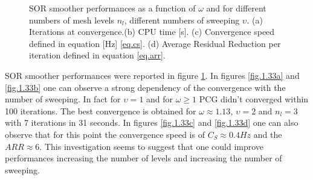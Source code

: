 \begin{figure}[hbt!]
{                             }
              \caption{SOR smoother performances as a function of $\omega$ and for different numbers of mesh levels $n_l$, different numbers of sweeping $\upsilon$. (a) Iterations at convergence.(b) CPU time [s]. (c) Convergence speed defined in equation [Hz] \eqref{eq.cs}. (d) Average Residual Reduction per iteration defined in equation \eqref{eq.arr}.}
              \label{f.1.33}
            \end{figure}
            SOR smoother performances were reported in figure \ref{f.1.33}. In figures \ref{fig.1.33a}  and \ref{fig.1.33b} one can observe a strong dependency of the convergence with the number of sweeping. In fact for $\upsilon=1$ and for $\omega\geq 1$ PCG didn't converged within 100 iterations. The best convergence is obtained for $\omega\approx1.13$, $\upsilon=2$ and $n_l=3$ with 7 iterations in 31 seconds. In figures \ref{fig.1.33c}  and \ref{fig.1.33d} one can also observe that for this point the convergence speed is of $C_S\approx0.4Hz$ and the $ARR\approx6$. This investigation seems to suggest that one could improve performances increasing the number of levels and increasing the number of sweeping. 
